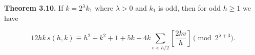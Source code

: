 \textbf{Theorem 3.10.}
If $k = 2^{\lambda}k_1$ where $\lambda > 0$ and $k_1$ is odd, then for odd $h \geq 1$ we have

$$
12hk\,s(h, k) \equiv h^2 + k^2 + 1 + 5k - 4k \sum_{v < h/2} \left[ \frac{2kv}{h} \right] \pmod{2^{\lambda+3}}.
$$
